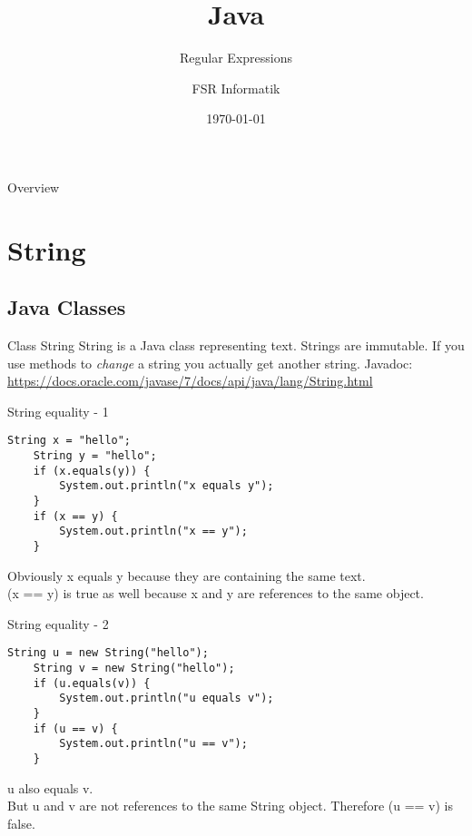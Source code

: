 

\title{Java}
\subtitle{Regular Expressions}
\author{FSR Informatik}
\date{\today}



\begin{frame}
\titlepage
\end{frame}

\begin{frame}{Overview}
\tableofcontents
\end{frame}

\section{String}
\subsection{Java Classes}
\begin{frame}{Class String}
	String is a Java class representing text.
	\vfill
	Strings are immutable. If you use methods to \emph{change} a string you actually get another string.
	\vfill
	Javadoc: \\
	\scriptsize
	\url{https://docs.oracle.com/javase/7/docs/api/java/lang/String.html}
\end{frame}

\begin{frame}[fragile]{String equality - 1}
	\begin{lstlisting}[basicstyle=\ttfamily\scriptsize]
	String x = "hello";
	String y = "hello";
	if (x.equals(y)) {
	    System.out.println("x equals y");
	}
	if (x == y) {
	    System.out.println("x == y");
	}
	\end{lstlisting}
	\vfill
	Obviously x equals y because they are containing the same text. \\
	(x == y) is true as well because x and y are references to the same object.
\end{frame}

\begin{frame}[fragile]{String equality - 2}
	\begin{lstlisting}[basicstyle=\ttfamily\scriptsize]
	String u = new String("hello");
	String v = new String("hello");
	if (u.equals(v)) {
	    System.out.println("u equals v");
	}
	if (u == v) {
	    System.out.println("u == v");
	}
	\end{lstlisting}
	\vfill
	u also equals v. \\
	But u and v are not references to the same String object.
	Therefore (u == v) is false.
\end{frame}

